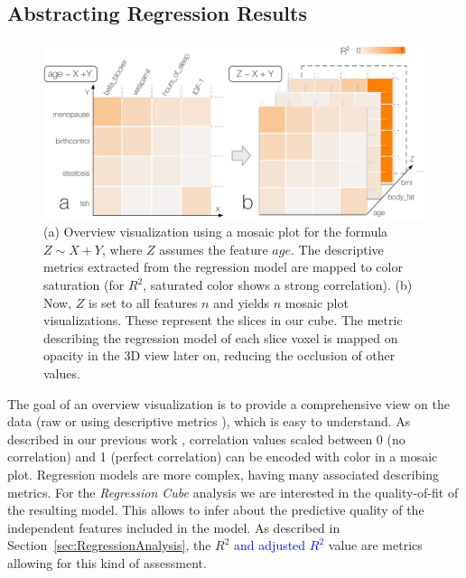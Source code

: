 \documentclass[journal]{style/vgtc} 			          %
\newcommand{\add}[1]{\textcolor{blue}{#1}}
\begin{document}
\subsection{Abstracting Regression Results}
\begin{figure}[htb]
 \centering
 \includegraphics[width=1.0\linewidth]{figures/cube}
 \caption{
 (a) Overview visualization using a mosaic plot for the formula $Z \sim X + Y$, where $Z$ assumes the feature $age$.
 The descriptive metrics extracted from the regression model are mapped to color saturation (for $R^2$, saturated color shows a strong correlation).
 (b) Now, $Z$ is set to all features $n$ and yields $n$ mosaic plot visualizations.
 These represent the slices in our cube.
 The metric describing the regression model of each slice voxel is mapped on opacity in the 3D view later on, reducing the occlusion of other values.
 }
  \label{fig:Cube}
\end{figure}
\noindent The goal of an overview visualization is to provide a comprehensive view on the data (raw or using descriptive metrics \cite{Bertini}), which is easy to understand.
As described in our previous work \cite{Klemm2014VIS}, correlation values scaled between 0 (no correlation) and 1 (perfect correlation) can be encoded with color in a mosaic plot.
Regression models are more complex, having many associated describing metrics.
For the \emph{Regression Cube} analysis we are interested in the quality-of-fit of the resulting model. 
This allows to infer about the predictive quality of the independent features included in the model.
As described in Section~\ref{sec:RegressionAnalysis}, the $R^2$ \add{and adjusted $R^2$} value are metrics allowing for this kind of assessment.
\end{document}
